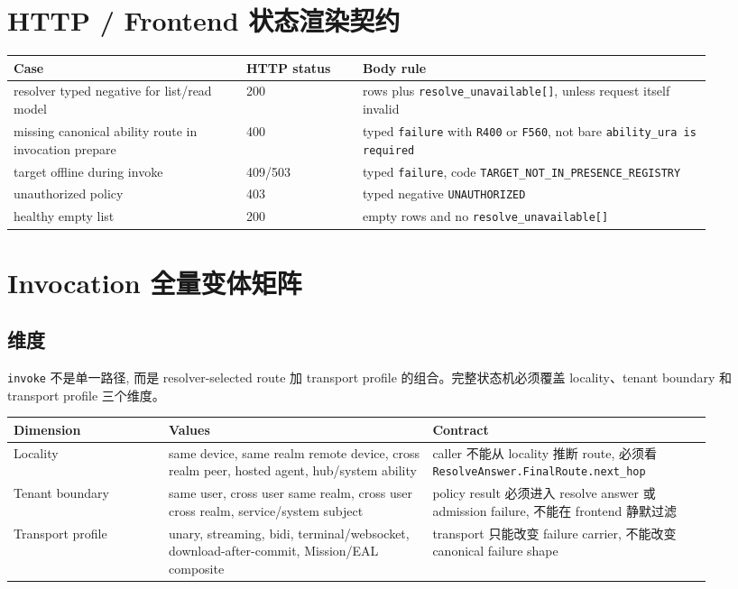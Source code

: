 \documentclass[11pt]{article}
\newcommand{\code}[1]{\texttt{#1}}
\begin{document}
\section{HTTP / Frontend 状态渲染契约}

\begin{longtable}{L{0.30\linewidth} L{0.15\linewidth} L{0.45\linewidth}}
\toprule
Case & HTTP status & Body rule \\
\midrule
resolver typed negative for list/read model & 200 & rows plus \code{resolve\_unavailable[]}, unless request itself invalid \\
missing canonical ability route in invocation prepare & 400 & typed \code{failure} with \code{R400} or \code{F560}, not bare \code{ability\_ura is required} \\
target offline during invoke & 409/503 & typed \code{failure}, code \code{TARGET\_NOT\_IN\_PRESENCE\_REGISTRY} \\
unauthorized policy & 403 & typed negative \code{UNAUTHORIZED} \\
healthy empty list & 200 & empty rows and no \code{resolve\_unavailable[]} \\
\bottomrule
\end{longtable}

\section{Invocation 全量变体矩阵}

\subsection{维度}

\code{invoke} 不是单一路径, 而是 resolver-selected route 加 transport profile 的组合。完整状态机必须覆盖 locality、tenant boundary 和 transport profile 三个维度。

\begin{longtable}{L{0.20\linewidth} L{0.34\linewidth} L{0.36\linewidth}}
\toprule
Dimension & Values & Contract \\
\midrule
Locality & same device, same realm remote device, cross realm peer, hosted agent, hub/system ability & caller 不能从 locality 推断 route, 必须看 \code{ResolveAnswer.FinalRoute.next\_hop} \\
Tenant boundary & same user, cross user same realm, cross user cross realm, service/system subject & policy result 必须进入 resolve answer 或 admission failure, 不能在 frontend 静默过滤 \\
Transport profile & unary, streaming, bidi, terminal/websocket, download-after-commit, Mission/EAL composite & transport 只能改变 failure carrier, 不能改变 canonical failure shape \\
\bottomrule
\end{longtable}
\end{document}
